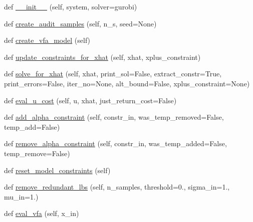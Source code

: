 \begin{DoxyCompactItemize}
\item 
def \mbox{\hyperlink{classgddp_1_1vfa_1_1_v_f_approximator_abe39aff2fd28268fc81a555b4d362a6b}{\+\_\+\+\_\+init\+\_\+\+\_\+}} (self, system, solver=\textquotesingle{}gurobi\textquotesingle{})
\item 
def \mbox{\hyperlink{classgddp_1_1vfa_1_1_v_f_approximator_a9083527d48dc57388dada7e7e39d23b3}{create\+\_\+audit\+\_\+samples}} (self, n\+\_\+s, seed=None)
\item 
def \mbox{\hyperlink{classgddp_1_1vfa_1_1_v_f_approximator_a612636b5857332f4798eab6dade1f729}{create\+\_\+vfa\+\_\+model}} (self)
\item 
def \mbox{\hyperlink{classgddp_1_1vfa_1_1_v_f_approximator_a35cb7f0c41c6bf65e709427245fff417}{update\+\_\+constraints\+\_\+for\+\_\+xhat}} (self, xhat, xplus\+\_\+constraint)
\item 
def \mbox{\hyperlink{classgddp_1_1vfa_1_1_v_f_approximator_af7e7b99c9816b5c809ea1a4b90c67df5}{solve\+\_\+for\+\_\+xhat}} (self, xhat, print\+\_\+sol=False, extract\+\_\+constr=True, print\+\_\+errors=False, iter\+\_\+no=None, alt\+\_\+bound=False, xplus\+\_\+constraint=None)
\item 
def \mbox{\hyperlink{classgddp_1_1vfa_1_1_v_f_approximator_afe4afaeb655002330027b925b77e8cc2}{eval\+\_\+u\+\_\+cost}} (self, u, xhat, just\+\_\+return\+\_\+cost=False)
\item 
def \mbox{\hyperlink{classgddp_1_1vfa_1_1_v_f_approximator_a5f5aa5208b059f55b4db350c4d5e1cc5}{add\+\_\+alpha\+\_\+constraint}} (self, constr\+\_\+in, was\+\_\+temp\+\_\+removed=False, temp\+\_\+add=False)
\item 
def \mbox{\hyperlink{classgddp_1_1vfa_1_1_v_f_approximator_a171722a3e9865a9eef226025e7a9425b}{remove\+\_\+alpha\+\_\+constraint}} (self, constr\+\_\+in, was\+\_\+temp\+\_\+added=False, temp\+\_\+remove=False)
\item 
def \mbox{\hyperlink{classgddp_1_1vfa_1_1_v_f_approximator_a9ed1c360f3f89aab1b0f5da4e2dc270f}{reset\+\_\+model\+\_\+constraints}} (self)
\item 
def \mbox{\hyperlink{classgddp_1_1vfa_1_1_v_f_approximator_afc1eaa9e77b92694ff7deab9ebfc33ed}{remove\+\_\+redundant\+\_\+lbs}} (self, n\+\_\+samples, threshold=0., sigma\+\_\+in=1., mu\+\_\+in=1.)
\item 
def \mbox{\hyperlink{classgddp_1_1vfa_1_1_v_f_approximator_a9dadd3236516d9054fba6eff668a11fd}{eval\+\_\+vfa}} (self, x\+\_\+in)
\item 

\end{DoxyCompactItemize}
